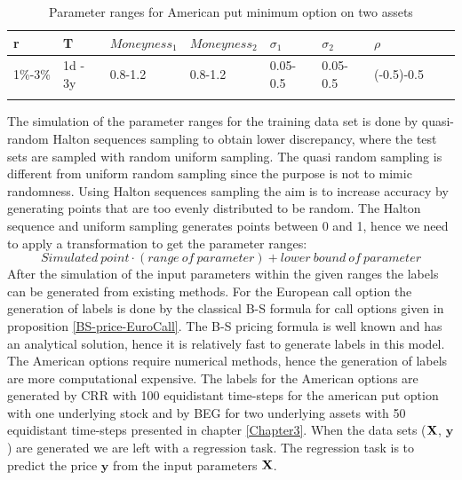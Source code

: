 \begin{table}[th]
\caption[Parameter Ranges For MLPs]{Parameter ranges for American put minimum option on two assets}
\label{tab:ExoticParRange}
\centering
\begin{tabular}{l l l l l l l l l}
\toprule
\textbf{r} & \textbf{T} & $Moneyness_1$ & $Moneyness_2$ & $\sigma_1$ & $\sigma_2$ & $\rho$ \\
\midrule
1\%-3\% & 1d - 3y & 0.8-1.2 & 0.8-1.2 & 0.05-0.5 & 0.05-0.5 & (-0.5)-0.5\\
\bottomrule\\
\end{tabular}
\end{table}

The simulation of the parameter ranges for the training data set is done by quasi-random Halton sequences sampling to obtain lower discrepancy, where the test sets are sampled with random uniform sampling. The quasi random sampling is different from uniform random sampling since the purpose is not to mimic randomness. Using Halton sequences sampling the aim is to increase accuracy by generating points that are too evenly distributed to be random. The Halton sequence and uniform sampling generates points between 0 and 1, hence we need to apply a transformation to get the parameter ranges:
$$Simulated \ point \cdot (range \ of \ parameter) + lower \ bound \ of \ parameter$$
After the simulation of the input parameters within the given ranges the labels can be generated from existing methods. For the European call option the generation of labels is done by the classical B-S formula for call options given in proposition \ref{BS-price-EuroCall}. The B-S pricing formula is well known and has an analytical solution, hence it is relatively fast to generate labels in this model. The American options require numerical methods, hence the generation of labels are more computational expensive. The labels for the American options are generated by CRR with 100 equidistant time-steps for the american put option with one underlying stock and by BEG for two underlying assets with 50 equidistant time-steps presented in chapter \ref{Chapter3}. When the data sets ($\mathbf{X}$, $\bm{y}$) are generated we are left with a regression task. The regression task is to predict the price $\bm{y}$ from the input parameters $\mathbf{X}$.\\ 

